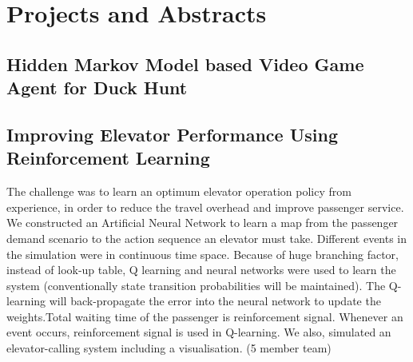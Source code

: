 \documentclass[11pt,a4paper]{moderncv}
\begin{document}
\pagebreak

\section{Projects and Abstracts}
\vspace{-3mm}
\subsection{Hidden Markov Model based Video Game Agent for Duck Hunt}

\subsection{Improving Elevator Performance Using Reinforcement Learning}
 {The challenge was to learn an optimum elevator operation policy from experience, in order to reduce the travel overhead and improve passenger service. We constructed an Artificial Neural Network to learn a map from the passenger demand scenario to the action sequence an elevator must take. Different events in the simulation were in continuous time space. Because of huge branching factor, instead of look-up table, Q learning and neural networks were used to learn the system (conventionally state transition probabilities will be maintained). The Q-learning will back-propagate the error into the neural network to update the weights.Total waiting time of the passenger is reinforcement signal. Whenever an event occurs, reinforcement signal is used in Q-learning. We also, simulated an elevator-calling system including a visualisation. (5 member team)}
\end{document}
